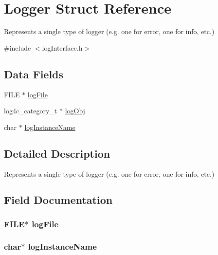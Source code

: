\hypertarget{struct_logger}{}\section{Logger Struct Reference}
\label{struct_logger}


Represents a single type of logger (e.\+g. one for error, one for info, etc.)  




{\ttfamily \#include $<$log\+Interface.\+h$>$}

\subsection*{Data Fields}
\begin{DoxyCompactItemize}
\item 
F\+I\+LE $\ast$ \hyperlink{struct_logger_a3c4a30fb69c55f449605ba662e0cf5c0}{log\+File}
\item 
log4c\+\_\+category\+\_\+t $\ast$ \hyperlink{struct_logger_a58685359e8778fe049020259831b4dd2}{log\+Obj}
\item 
char $\ast$ \hyperlink{struct_logger_adac7a3f217455034b7a9cb4ae9c39a8a}{log\+Instance\+Name}
\end{DoxyCompactItemize}


\subsection{Detailed Description}
Represents a single type of logger (e.\+g. one for error, one for info, etc.) 

\subsection{Field Documentation}
\subsubsection[{\texorpdfstring{log\+File}{logFile}}]{\setlength{\rightskip}{0pt plus 5cm}F\+I\+LE$\ast$ log\+File}\hypertarget{struct_logger_a3c4a30fb69c55f449605ba662e0cf5c0}{}\label{struct_logger_a3c4a30fb69c55f449605ba662e0cf5c0}
\subsubsection[{\texorpdfstring{log\+Instance\+Name}{logInstanceName}}]{\setlength{\rightskip}{0pt plus 5cm}char$\ast$ log\+Instance\+Name}\hypertarget{struct_logger_adac7a3f217455034b7a9cb4ae9c39a8a}{}\label{struct_logger_adac7a3f217455034b7a9cb4ae9c39a8a}
